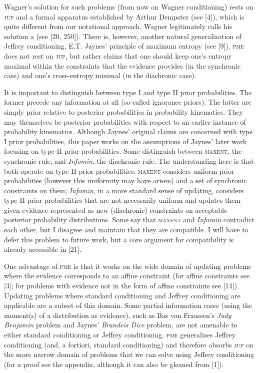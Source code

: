 Wagner's solution for such problems (from now on Wagner conditioning)
rests on \textsc{jup} and a formal apparatus established by Arthur
Dempster (see [4]), which is quite different from our notational
approach. Wagner legitimately calls his solution a  (see [20, 250]). There is,
however, another natural generalization of Jeffrey conditioning, E.T.
Jaynes' principle of maximum entropy (see [9]). \textsc{pme} does not
rest on \textsc{jup}, but rather claims that one should keep one's
entropy maximal within the constraints that the evidence provides (in
the synchronic case) and one's cross-entropy minimal (in the
diachronic case). 

It is important to distinguish between type I and type II prior
probabilities. The former precede any information at all (so-called
ignorance priors). The latter are simply prior relative to posterior
probabilities in probability kinematics. They may themselves be
posterior probabilities with respect to an earlier instance of
probability kinematics. Although Jaynes' original claims are concerned
with type I prior probabilities, this paper works on the assumptions
of Jaynes' later work focusing on type II prior probabilities. Some
distinguish between \textsc{maxent}, the synchronic rule, and
\emph{Infomin}, the diachronic rule. The understanding here is that
both operate on type II prior probabilities: \textsc{maxent} considers
uniform prior probabilities (however this uniformity may have arisen)
and a set of synchronic constraints on them; \emph{Infomin}, in a more
standard sense of updating, considers type II prior probabilities that
are not necessarily uniform and updates them given evidence
represented as new (diachronic) constraints on acceptable posterior
probability distributions. Some say that \textsc{maxent} and
\emph{Infomin} contradict each other, but I disagree and maintain that
they are compatible. I will have to defer this problem to future work,
but a core argument for compatibility is already accessible in [21].

One advantage of \textsc{pme} is that it works on the wide domain of
updating problems where the evidence corresponds to an affine
constraint (for affine constraints see [3]; for problems with
evidence not in the form of affine constraints see [14]). Updating
problems where standard conditioning and Jeffrey conditioning are
applicable are a subset of this domain. Some partial information cases
(using the moment(s) of a distribution as evidence), such as Bas van
Fraassen's \emph{Judy Benjamin} problem and Jaynes' \emph{Brandeis
  Dice} problem, are not amenable to either standard conditioning or
Jeffrey conditioning. \textsc{pme} generalizes Jeffrey conditioning
(and, a fortiori, standard conditioning) and therefore absorbs
\textsc{jup} on the more narrow domain of problems that we can solve
using Jeffrey conditioning (for a proof see the appendix, although it
can also be gleaned from [1]). 

